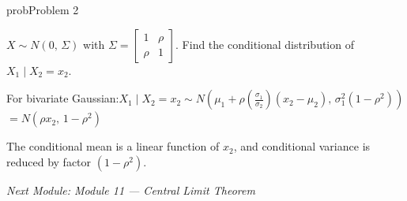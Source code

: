 \begin{PSbox}[unbreakable]{prob}{Problem 2}

$X \sim N(0,\, \Sigma)$ with $\Sigma = \begin{bmatrix} 1 & \rho \\ \rho & 1 \end{bmatrix}$. Find the conditional distribution of $X_{1} \mid X_{2} = x_{2}$.

\PSsolution{} For bivariate Gaussian:\PSbr{}$\displaystyle X_{1} \mid X_{2} = x_{2} \sim N\left(\mu_{1} + \rho \left(\frac{\sigma_{1}}{\sigma_{2}}\right)(x_{2}-\mu_{2}),\, \sigma_{1}^{2}(1-\rho^{2})\right)$\PSbr{}$= N(\rho x_{2},\, 1-\rho^{2})$

The conditional mean is a linear function of $x_{2}$, and conditional variance is reduced by factor $(1-\rho^{2})$.

\end{PSbox}

\emph{Next Module: {Module 11 — Central Limit Theorem}}
